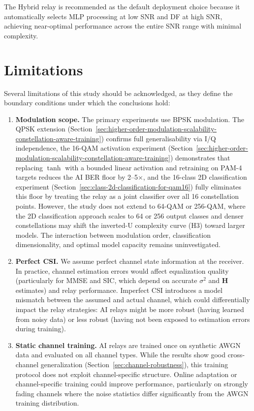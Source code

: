 The Hybrid relay is recommended as the default deployment choice because it automatically selects MLP processing at low SNR and DF at high SNR, achieving near-optimal performance across the entire SNR range with minimal complexity.

\section{Limitations}\label{sec:limitations}

Several limitations of this study should be acknowledged, as they define the boundary conditions under which the conclusions hold:

\begin{enumerate}
\def\labelenumi{\arabic{enumi}.}
\item
  \textbf{Modulation scope.} The primary experiments use BPSK modulation. The QPSK extension (Section~\ref{sec:higher-order-modulation-scalability-constellation-aware-training}) confirms full generalisability via I/Q independence, the 16-QAM activation experiment (Section~\ref{sec:higher-order-modulation-scalability-constellation-aware-training}) demonstrates that replacing \(\tanh\) with a bounded linear activation and retraining on PAM-4 targets reduces the AI BER floor by 2--5×, and the 16-class 2D classification experiment (Section~\ref{sec:class-2d-classification-for-qam16}) fully eliminates this floor by treating the relay as a joint classifier over all 16 constellation points. However, the study does not extend to 64-QAM or 256-QAM, where the 2D classification approach scales to 64 or 256 output classes and denser constellations may shift the inverted-U complexity curve (H3) toward larger models. The interaction between modulation order, classification dimensionality, and optimal model capacity remains uninvestigated.
\item
  \textbf{Perfect CSI.} We assume perfect channel state information at the receiver. In practice, channel estimation errors would affect equalization quality (particularly for MMSE and SIC, which depend on accurate \(\sigma^2\) and \(\mathbf{H}\) estimates) and relay performance. Imperfect CSI introduces a model mismatch between the assumed and actual channel, which could differentially impact the relay strategies: AI relays might be more robust (having learned from noisy data) or less robust (having not been exposed to estimation errors during training).
\item
  \textbf{Static channel training.} AI relays are trained once on synthetic AWGN data and evaluated on all channel types. While the results show good cross-channel generalization (Section~\ref{sec:channel-robustness}), this training protocol does not exploit channel-specific structure. Online adaptation or channel-specific training could improve performance, particularly on strongly fading channels where the noise statistics differ significantly from the AWGN training distribution.

\end{enumerate}
